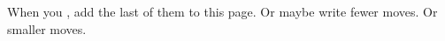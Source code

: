 \documentclass{dw2_playbook}
\begin{document}
%
\pageThree
    {
        \advancedMovesCont
    }
    {
        {
          When you , add the last of them to this page.  Or maybe write fewer moves.  Or smaller moves.
        }
    }
    {
      \multiclassmove
      \gap
      \multiclassmove
      \gap
      \multiclassmove
    }



\clearpage
~

\resourceLinksPage
    {
    }
\end{document}
